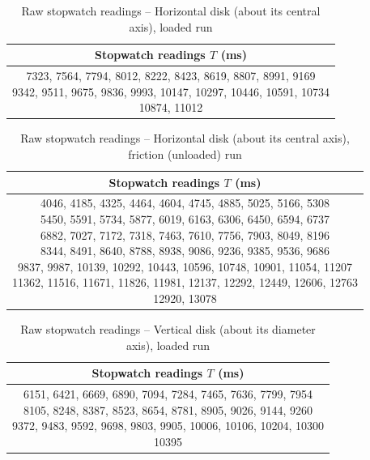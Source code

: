 \begin{table}[htb!]
\centering
\caption{Raw stopwatch readings -- Horizontal disk (about its central axis), loaded run}
\begin{tabular}{c}
\toprule
Stopwatch readings $T$ (\unit{\ms}) \\
\midrule
\makecell{7323, 7564, 7794, 8012, 8222, 8423, 8619, 8807, 8991, 9169 \\ 9342, 9511, 9675, 9836, 9993, 10147, 10297, 10446, 10591, 10734 \\ 10874, 11012} \\
\bottomrule
\end{tabular}
\end{table}
\begin{table}[htb!]
\centering
\caption{Raw stopwatch readings -- Horizontal disk (about its central axis), friction (unloaded) run}
\begin{tabular}{c}
\toprule
Stopwatch readings $T$ (\unit{\ms}) \\
\midrule
\makecell{4046, 4185, 4325, 4464, 4604, 4745, 4885, 5025, 5166, 5308 \\ 5450, 5591, 5734, 5877, 6019, 6163, 6306, 6450, 6594, 6737 \\ 6882, 7027, 7172, 7318, 7463, 7610, 7756, 7903, 8049, 8196 \\ 8344, 8491, 8640, 8788, 8938, 9086, 9236, 9385, 9536, 9686 \\ 9837, 9987, 10139, 10292, 10443, 10596, 10748, 10901, 11054, 11207 \\ 11362, 11516, 11671, 11826, 11981, 12137, 12292, 12449, 12606, 12763 \\ 12920, 13078} \\
\bottomrule
\end{tabular}
\end{table}
\begin{table}[htb!]
\centering
\caption{Raw stopwatch readings -- Vertical disk (about its diameter axis), loaded run}
\begin{tabular}{c}
\toprule
Stopwatch readings $T$ (\unit{\ms}) \\
\midrule
\makecell{6151, 6421, 6669, 6890, 7094, 7284, 7465, 7636, 7799, 7954 \\ 8105, 8248, 8387, 8523, 8654, 8781, 8905, 9026, 9144, 9260 \\ 9372, 9483, 9592, 9698, 9803, 9905, 10006, 10106, 10204, 10300 \\ 10395} \\
\bottomrule
\end{tabular}
\end{table}
